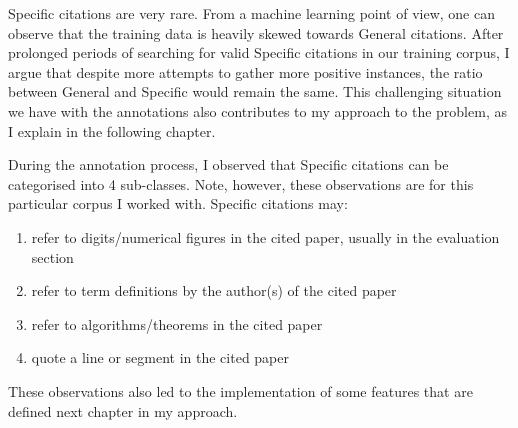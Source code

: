 Specific citations are very rare. From a machine learning point of view, one can observe that the training data is heavily skewed towards General citations. After prolonged periods of searching for valid Specific citations in our training corpus, I argue that despite more attempts to gather more positive instances, the ratio between General and Specific would remain the same. This challenging situation we have with the annotations also contributes to my approach to the problem, as I explain in the following chapter.

During the annotation process, I observed that Specific citations can be categorised into 4 sub-classes. Note, however, these observations are for this particular corpus I worked with. Specific citations may:
\begin{enumerate}
\item refer to digits/numerical figures in the cited paper, usually in the evaluation section
\item refer to term definitions by the author(s) of the cited paper
\item refer to algorithms/theorems in the cited paper
\item quote a line or segment in the cited paper
\end{enumerate}
These observations also led to the implementation of some features that are defined next chapter in my approach.